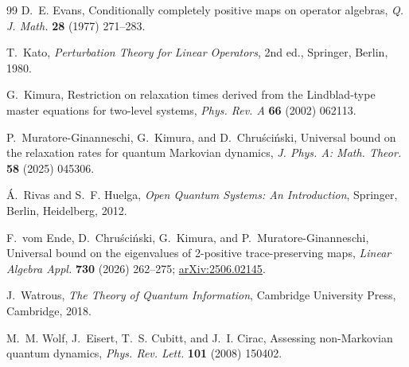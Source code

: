 \documentclass[11pt,a4paper]{article}
\theoremstyle{plain}
\theoremstyle{definition}
\theoremstyle{remark}
\numberwithin{equation}{section}
\begin{document}
\begin{thebibliography}{99}
D.~E. Evans,
Conditionally completely positive maps on operator algebras,
\emph{Q. J. Math.} \textbf{28} (1977) 271--283.

T.~Kato,
\emph{Perturbation Theory for Linear Operators}, 2nd ed.,
Springer, Berlin, 1980.

G.~Kimura,
Restriction on relaxation times derived from the Lindblad-type master equations
for two-level systems,
\emph{Phys. Rev. A} \textbf{66} (2002) 062113.

P.~Muratore-Ginanneschi, G.~Kimura, and D.~Chru\'sci\'nski,
Universal bound on the relaxation rates for quantum Markovian dynamics,
\emph{J. Phys. A: Math. Theor.} \textbf{58} (2025) 045306.

\'A.~Rivas and S.~F. Huelga,
\emph{Open Quantum Systems: An Introduction},
Springer, Berlin, Heidelberg, 2012.

F.~vom Ende, D.~Chru\'sci\'nski, G.~Kimura, and P.~Muratore-Ginanneschi,
Universal bound on the eigenvalues of 2-positive trace-preserving maps,
\emph{Linear Algebra Appl.} \textbf{730} (2026) 262--275;
\href{https://arxiv.org/abs/2506.02145}{arXiv:2506.02145}.

J.~Watrous,
\emph{The Theory of Quantum Information},
Cambridge University Press, Cambridge, 2018.

M.~M. Wolf, J.~Eisert, T.~S. Cubitt, and J.~I. Cirac,
Assessing non-Markovian quantum dynamics,
\emph{Phys. Rev. Lett.} \textbf{101} (2008) 150402.

\end{thebibliography}
\end{document}
